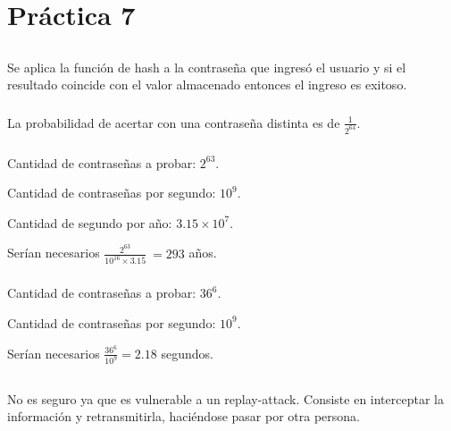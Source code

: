 \section{Práctica 7}

\subsection{}

\subsubsection{}
Se aplica la función de hash a la contraseña que ingresó el usuario y si el
resultado coincide con el valor almacenado entonces el ingreso es exitoso.

\subsubsection{}
La probabilidad de acertar con una contraseña distinta es de $\frac{1}{2^64}$.

\subsubsection{}
Cantidad de contraseñas a probar: $2^63$.

Cantidad de contraseñas por segundo: $10^9$.

Cantidad de segundo por año: $3.15 \times 10^7$.

Serían necesarios $\frac{2^63}{10^16 \times 3.15} ~= 293$ años.

\subsubsection{}
Cantidad de contraseñas a probar: $36^6$.

Cantidad de contraseñas por segundo: $10^9$.

Serían necesarios $\frac{36^6}{10^9} = 2.18$ segundos.

\subsection{}

\subsubsection{}
No es seguro ya que es vulnerable a un replay-attack. Consiste en interceptar
la información y retransmitirla, haciéndose pasar por otra persona.

